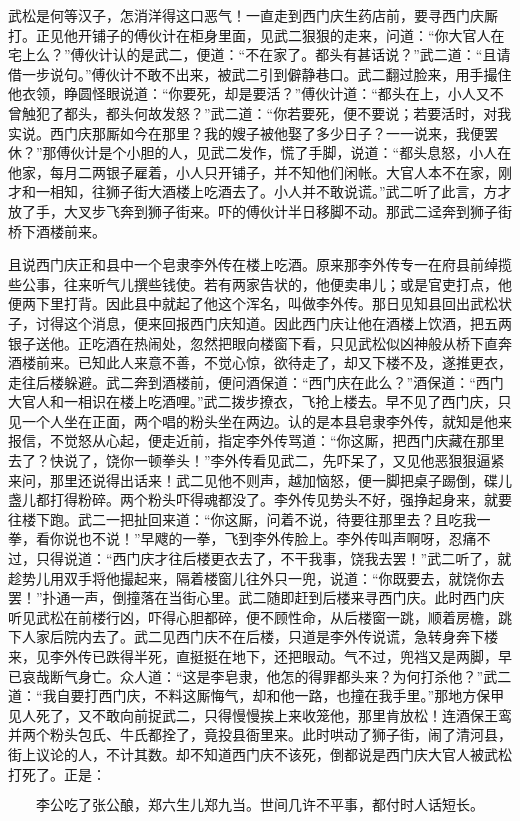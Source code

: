 武松是何等汉子，怎消洋得这口恶气！一直走到西门庆生药店前，要寻西门庆厮打。正见他开铺子的傅伙计在柜身里面，见武二狠狠的走来，问道：“你大官人在宅上么？”傅伙计认的是武二，便道：“不在家了。都头有甚话说？”武二道：“且请借一步说句。”傅伙计不敢不出来，被武二引到僻静巷口。武二翻过脸来，用手撮住他衣领，睁圆怪眼说道：“你要死，却是要活？”傅伙计道：“都头在上，小人又不曾触犯了都头，都头何故发怒？”武二道：“你若要死，便不要说；若要活时，对我实说。西门庆那厮如今在那里？我的嫂子被他娶了多少日子？一一说来，我便罢休？”那傅伙计是个小胆的人，见武二发作，慌了手脚，说道：“都头息怒，小人在他家，每月二两银子雇着，小人只开铺子，并不知他们闲帐。大官人本不在家，刚才和一相知，往狮子街大酒楼上吃酒去了。小人并不敢说谎。”武二听了此言，方才放了手，大叉步飞奔到狮子街来。吓的傅伙计半日移脚不动。那武二迳奔到狮子街桥下酒楼前来。

且说西门庆正和县中一个皂隶李外传在楼上吃酒。原来那李外传专一在府县前绰揽些公事，往来听气儿撰些钱使。若有两家告状的，他便卖串儿；或是官吏打点，他便两下里打背。因此县中就起了他这个浑名，叫做李外传。那日见知县回出武松状子，讨得这个消息，便来回报西门庆知道。因此西门庆让他在酒楼上饮酒，把五两银子送他。正吃酒在热闹处，忽然把眼向楼窗下看，只见武松似凶神般从桥下直奔酒楼前来。已知此人来意不善，不觉心惊，欲待走了，却又下楼不及，遂推更衣，走往后楼躲避。武二奔到酒楼前，便问酒保道：“西门庆在此么？”酒保道：“西门大官人和一相识在楼上吃酒哩。”武二拨步撩衣，飞抢上楼去。早不见了西门庆，只见一个人坐在正面，两个唱的粉头坐在两边。认的是本县皂隶李外传，就知是他来报信，不觉怒从心起，便走近前，指定李外传骂道：“你这厮，把西门庆藏在那里去了？快说了，饶你一顿拳头！”李外传看见武二，先吓呆了，又见他恶狠狠逼紧来问，那里还说得出话来！武二见他不则声，越加恼怒，便一脚把桌子踢倒，碟儿盏儿都打得粉碎。两个粉头吓得魂都没了。李外传见势头不好，强挣起身来，就要往楼下跑。武二一把扯回来道：“你这厮，问着不说，待要往那里去？且吃我一拳，看你说也不说！”早飕的一拳，飞到李外传脸上。李外传叫声啊呀，忍痛不过，只得说道：“西门庆才往后楼更衣去了，不干我事，饶我去罢！”武二听了，就趁势儿用双手将他撮起来，隔着楼窗儿往外只一兜，说道：“你既要去，就饶你去罢！”扑通一声，倒撞落在当街心里。武二随即赶到后楼来寻西门庆。此时西门庆听见武松在前楼行凶，吓得心胆都碎，便不顾性命，从后楼窗一跳，顺着房檐，跳下人家后院内去了。武二见西门庆不在后楼，只道是李外传说谎，急转身奔下楼来，见李外传已跌得半死，直挺挺在地下，还把眼动。气不过，兜裆又是两脚，早已哀哉断气身亡。众人道：“这是李皂隶，他怎的得罪都头来？为何打杀他？”武二道：“我自要打西门庆，不料这厮悔气，却和他一路，也撞在我手里。”那地方保甲见人死了，又不敢向前捉武二，只得慢慢挨上来收笼他，那里肯放松！连酒保王鸾并两个粉头包氏、牛氏都拴了，竟投县衙里来。此时哄动了狮子街，闹了清河县，街上议论的人，不计其数。却不知道西门庆不该死，倒都说是西门庆大官人被武松打死了。正是：

\[
李公吃了张公酿，郑六生儿郑九当。
世间几许不平事，都付时人话短长。
\]
